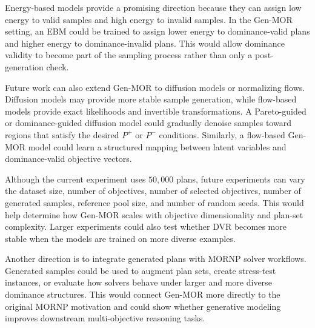 Energy-based models provide a promising direction because they can assign low energy to valid samples and high energy to invalid samples. In the Gen-MOR setting, an EBM could be trained to assign lower energy to dominance-valid plans and higher energy to dominance-invalid plans. This would allow dominance validity to become part of the sampling process rather than only a post-generation check.

Future work can also extend Gen-MOR to diffusion models or normalizing flows. Diffusion models may provide more stable sample generation, while flow-based models provide exact likelihoods and invertible transformations. A Pareto-guided or dominance-guided diffusion model could gradually denoise samples toward regions that satisfy the desired $P^{+}$ or $P^{-}$ conditions. Similarly, a flow-based Gen-MOR model could learn a structured mapping between latent variables and dominance-valid objective vectors.

Although the current experiment uses $50{,}000$ plans, future experiments can vary the dataset size, number of objectives, number of selected objectives, number of generated samples, reference pool size, and number of random seeds. This would help determine how Gen-MOR scales with objective dimensionality and plan-set complexity. Larger experiments could also test whether DVR becomes more stable when the models are trained on more diverse examples.

Another direction is to integrate generated plans with MORNP solver workflows. Generated samples could be used to augment plan sets, create stress-test instances, or evaluate how solvers behave under larger and more diverse dominance structures. This would connect Gen-MOR more directly to the original MORNP motivation and could show whether generative modeling improves downstream multi-objective reasoning tasks.